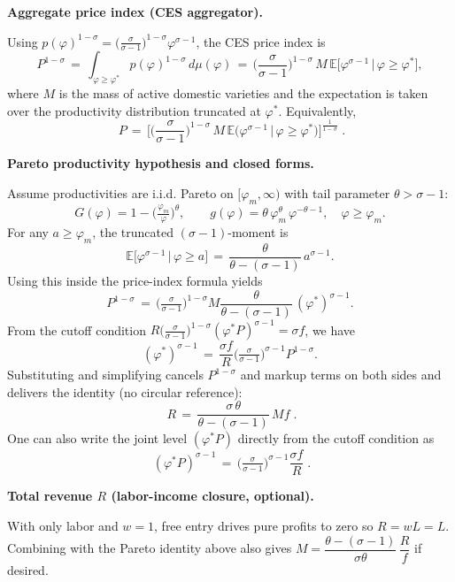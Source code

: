 \begin{solution}
    \bigskip
    	\textbf{Aggregate price index (CES aggregator).}
    
    Using $p(\varphi)^{1-\sigma}=\big(\tfrac{\sigma}{\sigma-1}\big)^{1-\sigma} \varphi^{\sigma-1}$, the CES price index is
    \[
        P^{1-\sigma} \,=\, \int_{\varphi\ge \varphi^*} p(\varphi)^{1-\sigma}\, d\mu(\varphi)
        \,=\, \Big(\frac{\sigma}{\sigma-1}\Big)^{1-\sigma}\, M\, \mathbb{E}\big[\varphi^{\sigma-1}\,\big|\,\varphi\ge \varphi^*\big],
    \]
    where $M$ is the mass of active domestic varieties and the expectation is taken over the productivity distribution truncated at $\varphi^*$. Equivalently,
    \[
        \boxed{\;\displaystyle P \,=\, \Big[\Big(\frac{\sigma}{\sigma-1}\Big)^{1-\sigma}\, M\, \mathbb{E}\big(\varphi^{\sigma-1}\,\big|\,\varphi\ge \varphi^*\big)\Big]^{\!\tfrac{1}{1-\sigma}}\; }.
    \]
    
    \bigskip
    	\textbf{Pareto productivity hypothesis and closed forms.}

    Assume productivities are i.i.d. Pareto on $[\varphi_m,\infty)$ with tail parameter $\theta>\sigma-1$:
    \[
        G(\varphi)=1-\Big(\tfrac{\varphi_m}{\varphi}\Big)^{\!\theta},\qquad g(\varphi)=\theta\,\varphi_m^{\theta}\,\varphi^{-\theta-1},\quad \varphi\ge\varphi_m.
    \]
    For any $a\ge\varphi_m$, the truncated $(\sigma-1)$-moment is
    \[
        \mathbb{E}\big[\varphi^{\sigma-1}\,\big|\,\varphi\ge a\big] \,=\, \frac{\theta}{\theta-(\sigma-1)}\, a^{\sigma-1}.
    \]
    Using this inside the price-index formula yields
    \[
        P^{1-\sigma} \,=\, \Big(\tfrac{\sigma}{\sigma-1}\Big)^{1-\sigma} M \frac{\theta}{\theta-(\sigma-1)}\, (\varphi^*)^{\sigma-1}.
    \]
    From the cutoff condition $R\Big(\tfrac{\sigma}{\sigma-1}\Big)^{1-\sigma} (\varphi^* P)^{\sigma-1}=\sigma f$, we have
    \[
        (\varphi^*)^{\sigma-1} \,=\, \frac{\sigma f}{R}\Big(\tfrac{\sigma}{\sigma-1}\Big)^{\!\sigma-1} P^{1-\sigma}.
    \]
    Substituting and simplifying cancels $P^{1-\sigma}$ and markup terms on both sides and delivers the identity (no circular reference):
    \[
        \boxed{\; R \,=\, \frac{\sigma\,\theta}{\theta-(\sigma-1)}\, M f \; }.
    \]
    One can also write the joint level $(\varphi^* P)$ directly from the cutoff condition as
    \[
        \boxed{\; (\varphi^* P)^{\sigma-1} \,=\, \Big(\tfrac{\sigma}{\sigma-1}\Big)^{\!\sigma-1} \frac{\sigma f}{R} \; }.
    \]

    \bigskip
    	\textbf{Total revenue $R$ (labor-income closure, optional).}

    With only labor and $w=1$, free entry drives pure profits to zero so $R=wL=L$. Combining with the Pareto identity above also gives $M=\dfrac{\theta-(\sigma-1)}{\sigma\theta}\,\dfrac{R}{f}$ if desired.
    

\end{solution}
